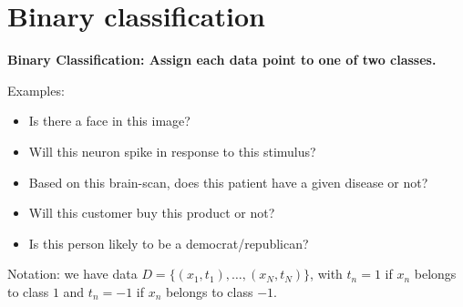 \section{Binary classification}
\textbf{Binary Classification: Assign each data point to one of two classes.} 

Examples:
\begin{itemize}
 \item Is there a face in this image?
\item Will this neuron spike in response to this stimulus?
\item Based on this brain-scan, does this patient have a given disease or not?
\item  Will this customer buy this product or not?
\item Is this person likely to be a democrat/republican? 
\end{itemize}
Notation: we have data $D=\{(x_1, t_1),\ldots, (x_N, t_N)\}$, with $t_n=1$ if $x_n$ belongs to class $1$ and $t_n=-1$ if $x_n$ belongs to class $-1$.


